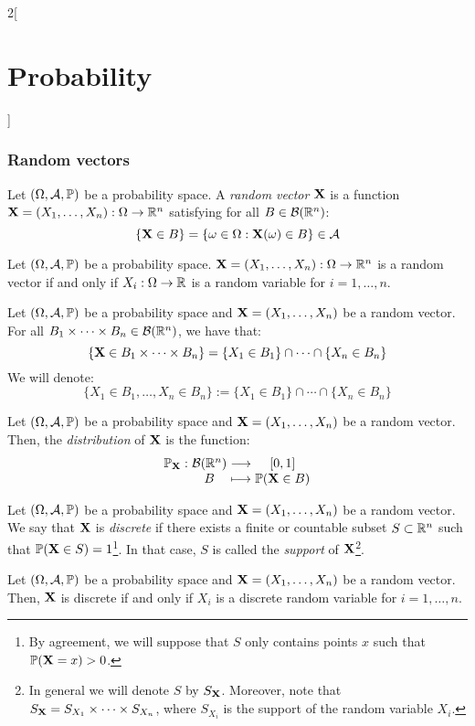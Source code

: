 \documentclass[../../../main_math.tex]{subfiles}
\begin{document}
\begin{multicols}{2}[\section{Probability}]
  \subsubsection{Random vectors}
  \begin{definition}
    Let $(\Omega,\mathcal{A},\mathbb{P})$ be a probability space. A \emph{random vector} $\boldsymbol{\mathrm{X}}$ is a function $\boldsymbol{\mathrm{X}}=(X_1,\ldots,X_n):\Omega\rightarrow\mathbb{R}^n$ satisfying for all $B\in\mathcal{B}(\mathbb{R}^n)$: $$\{\boldsymbol{\mathrm{X}}\in B\}=\{\omega\in\Omega:\boldsymbol{\mathrm{X}}(\omega)\in B\}\in\mathcal{A}$$
  \end{definition}
  \begin{proposition}
    Let $(\Omega,\mathcal{A},\mathbb{P})$ be a probability space. $\boldsymbol{\mathrm{X}}=(X_1,\ldots,X_n):\Omega\rightarrow\mathbb{R}^n$ is a random vector if and only if $X_i:\Omega\rightarrow\mathbb{R}$ is a random variable for $i=1,\ldots,n$.
  \end{proposition}
  \begin{definition}
    Let $(\Omega,\mathcal{A},\mathbb{P})$ be a probability space and $\boldsymbol{\mathrm{X}}=(X_1,\ldots,X_n)$ be a random vector. For all $B_1\times\cdots\times B_n\in\mathcal{B}(\mathbb{R}^n)$, we have that: $$\{\boldsymbol{\mathrm{X}}\in B_1\times\cdots\times B_n\}=\{X_1\in B_1\}\cap\cdots\cap\{X_n\in B_n\}$$ We will denote: $$\{X_1\in B_1,\ldots,X_n\in B_n\}:=\{X_1\in B_1\}\cap\cdots\cap\{X_n\in B_n\}$$
  \end{definition}
  \begin{definition}
    Let $(\Omega,\mathcal{A},\mathbb{P})$ be a probability space and $\boldsymbol{\mathrm{X}}=(X_1,\ldots,X_n)$ be a random vector. Then, the \emph{distribution} of $\boldsymbol{\mathrm{X}}$ is the function:
    $$
      \function{\Prob_{\vf{X}}}{\mathcal{B}(\RR^n)}{[0,1]}{B}{\Prob(\vf{X}\in B)}
    $$
  \end{definition}
  \begin{definition}
    Let $(\Omega,\mathcal{A},\mathbb{P})$ be a probability space and $\boldsymbol{\mathrm{X}}=(X_1,\ldots,X_n)$ be a random vector. We say that $\boldsymbol{\mathrm{X}}$ is \emph{discrete} if there exists a finite or countable subset $S\subset\mathbb{R}^n$ such that $\mathbb{P}(\boldsymbol{\mathrm{X}}\in S)=1$\footnote{By agreement, we will suppose that $S$ only contains points $x$ such that $\mathbb{P}(\boldsymbol{\mathrm{X}}=x)>0$.}. In that case, $S$ is called the \emph{support} of $\boldsymbol{\mathrm{X}}$\footnote{In general we will denote $S$ by $S_{\boldsymbol{\mathrm{X}}}$. Moreover, note that $S_{\boldsymbol{\mathrm{X}}}=S_{X_1}\times\cdots\times S_{X_n}$, where $S_{X_i}$ is the support of the random variable $X_i$.}.
  \end{definition}
  \begin{proposition}
    Let $(\Omega,\mathcal{A},\mathbb{P})$ be a probability space and $\boldsymbol{\mathrm{X}}=(X_1,\ldots,X_n)$ be a random vector. Then, $\boldsymbol{\mathrm{X}}$ is discrete if and only if $X_i$ is a discrete random variable for $i=1,\ldots,n$.

\end{proposition}
\end{multicols}
\end{document}
